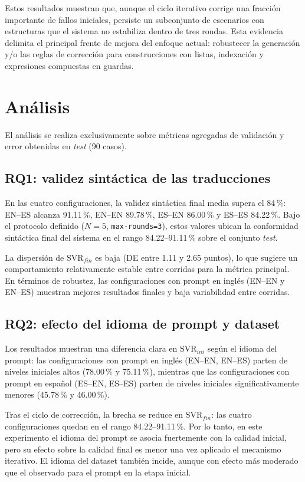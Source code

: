 Estos resultados muestran que, aunque el ciclo iterativo corrige una fracción importante de fallos iniciales, persiste un subconjunto de escenarios con estructuras que el sistema no estabiliza dentro de tres rondas. Esta evidencia delimita el principal frente de mejora del enfoque actual: robustecer la generación y/o las reglas de corrección para construcciones con listas, indexación y expresiones compuestas en guardas.

\section{Análisis}

El análisis se realiza exclusivamente sobre métricas agregadas de validación y error obtenidas en \textit{test} (90 casos).

\subsection{RQ1: validez sintáctica de las traducciones}

En las cuatro configuraciones, la validez sintáctica final media supera el 84\,\%: EN--ES alcanza 91.11\,\%, EN--EN 89.78\,\%, ES--EN 86.00\,\% y ES--ES 84.22\,\%. Bajo el protocolo definido ($N=5$, \texttt{max-rounds=3}), estos valores ubican la conformidad sintáctica final del sistema en el rango 84.22--91.11\,\% sobre el conjunto \textit{test}.

La dispersión de $\text{SVR}_{fin}$ es baja (DE entre 1.11 y 2.65 puntos), lo que sugiere un comportamiento relativamente estable entre corridas para la métrica principal. En términos de robustez, las configuraciones con prompt en inglés (EN--EN y EN--ES) muestran mejores resultados finales y baja variabilidad entre corridas.

\subsection{RQ2: efecto del idioma de prompt y dataset}

Los resultados muestran una diferencia clara en $\text{SVR}_{ini}$ según el idioma del prompt: las configuraciones con prompt en inglés (EN--EN, EN--ES) parten de niveles iniciales altos (78.00\,\% y 75.11\,\%), mientras que las configuraciones con prompt en español (ES--EN, ES--ES) parten de niveles iniciales significativamente menores (45.78\,\% y 46.00\,\%).

Tras el ciclo de corrección, la brecha se reduce en $\text{SVR}_{fin}$: las cuatro configuraciones quedan en el rango 84.22--91.11\,\%. Por lo tanto, en este experimento el idioma del prompt se asocia fuertemente con la calidad inicial, pero su efecto sobre la calidad final es menor una vez aplicado el mecanismo iterativo. El idioma del dataset también incide, aunque con efecto más moderado que el observado para el prompt en la etapa inicial.

